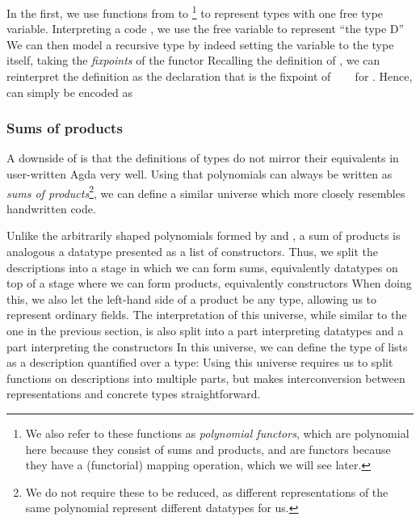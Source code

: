 In the first, we use functions from  to \footnote{We also refer to these functions as \emph{polynomial functors}, which are polynomial here because they consist of sums and products, and are functors because they have a (functorial) mapping operation, which we will see later.} to represent types with one free type variable. Interpreting a code , we use the free variable  to represent ``the type D''
We can then model a recursive type by indeed setting the variable to the type itself, taking the \emph{fixpoints} of the functor
Recalling the definition of \bN{}, we can reinterpret the definition as the declaration that  is the fixpoint of \ \ \  for . Hence, \bN{} can simply be encoded as

\subsubsection{Sums of products}\label{ssec:background-sop}
A downside of  is that the definitions of types do not mirror their equivalents in user-written Agda very well. Using that polynomials can always be written as \emph{sums of products}\footnote{We do not require these to be reduced, as different representations of the same polynomial represent different datatypes for us.}, we can define a similar universe which more closely resembles handwritten code.

Unlike the arbitrarily shaped polynomials formed by  and , a sum of products is analogous a datatype presented as a list of constructors. Thus, we split the descriptions into a stage in which we can form sums, equivalently datatypes
on top of a stage where we can form products, equivalently constructors
When doing this, we also let the left-hand side of a product be any type, allowing us to represent ordinary fields. The interpretation of this universe, while similar to the one in the previous section, is also split into a part interpreting datatypes
and a part interpreting the constructors
In this universe, we can define the type of lists as a description quantified over a type:
Using this universe requires us to split functions on descriptions into multiple parts, but makes interconversion between representations and concrete types straightforward.

